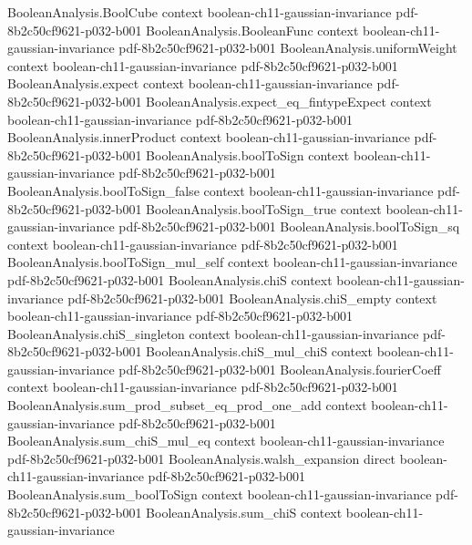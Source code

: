 \begin{lemma}
\proofstep
  {BooleanAnalysis.BoolCube}
  {context}
  {boolean-ch11-gaussian-invariance}
  {pdf-8b2c50cf9621-p032-b001}
\proofstep
  {BooleanAnalysis.BooleanFunc}
  {context}
  {boolean-ch11-gaussian-invariance}
  {pdf-8b2c50cf9621-p032-b001}
\proofstep
  {BooleanAnalysis.uniformWeight}
  {context}
  {boolean-ch11-gaussian-invariance}
  {pdf-8b2c50cf9621-p032-b001}
\proofstep
  {BooleanAnalysis.expect}
  {context}
  {boolean-ch11-gaussian-invariance}
  {pdf-8b2c50cf9621-p032-b001}
\proofstep
  {BooleanAnalysis.expect_eq_fintypeExpect}
  {context}
  {boolean-ch11-gaussian-invariance}
  {pdf-8b2c50cf9621-p032-b001}
\proofstep
  {BooleanAnalysis.innerProduct}
  {context}
  {boolean-ch11-gaussian-invariance}
  {pdf-8b2c50cf9621-p032-b001}
\proofstep
  {BooleanAnalysis.boolToSign}
  {context}
  {boolean-ch11-gaussian-invariance}
  {pdf-8b2c50cf9621-p032-b001}
\proofstep
  {BooleanAnalysis.boolToSign_false}
  {context}
  {boolean-ch11-gaussian-invariance}
  {pdf-8b2c50cf9621-p032-b001}
\proofstep
  {BooleanAnalysis.boolToSign_true}
  {context}
  {boolean-ch11-gaussian-invariance}
  {pdf-8b2c50cf9621-p032-b001}
\proofstep
  {BooleanAnalysis.boolToSign_sq}
  {context}
  {boolean-ch11-gaussian-invariance}
  {pdf-8b2c50cf9621-p032-b001}
\proofstep
  {BooleanAnalysis.boolToSign_mul_self}
  {context}
  {boolean-ch11-gaussian-invariance}
  {pdf-8b2c50cf9621-p032-b001}
\proofstep
  {BooleanAnalysis.chiS}
  {context}
  {boolean-ch11-gaussian-invariance}
  {pdf-8b2c50cf9621-p032-b001}
\proofstep
  {BooleanAnalysis.chiS_empty}
  {context}
  {boolean-ch11-gaussian-invariance}
  {pdf-8b2c50cf9621-p032-b001}
\proofstep
  {BooleanAnalysis.chiS_singleton}
  {context}
  {boolean-ch11-gaussian-invariance}
  {pdf-8b2c50cf9621-p032-b001}
\proofstep
  {BooleanAnalysis.chiS_mul_chiS}
  {context}
  {boolean-ch11-gaussian-invariance}
  {pdf-8b2c50cf9621-p032-b001}
\proofstep
  {BooleanAnalysis.fourierCoeff}
  {context}
  {boolean-ch11-gaussian-invariance}
  {pdf-8b2c50cf9621-p032-b001}
\proofstep
  {BooleanAnalysis.sum_prod_subset_eq_prod_one_add}
  {context}
  {boolean-ch11-gaussian-invariance}
  {pdf-8b2c50cf9621-p032-b001}
\proofstep
  {BooleanAnalysis.sum_chiS_mul_eq}
  {context}
  {boolean-ch11-gaussian-invariance}
  {pdf-8b2c50cf9621-p032-b001}
\proofstep
  {BooleanAnalysis.walsh_expansion}
  {direct}
  {boolean-ch11-gaussian-invariance}
  {pdf-8b2c50cf9621-p032-b001}
\proofstep
  {BooleanAnalysis.sum_boolToSign}
  {context}
  {boolean-ch11-gaussian-invariance}
  {pdf-8b2c50cf9621-p032-b001}
\proofstep
  {BooleanAnalysis.sum_chiS}
  {context}
  {boolean-ch11-gaussian-invariance}

\end{lemma}
